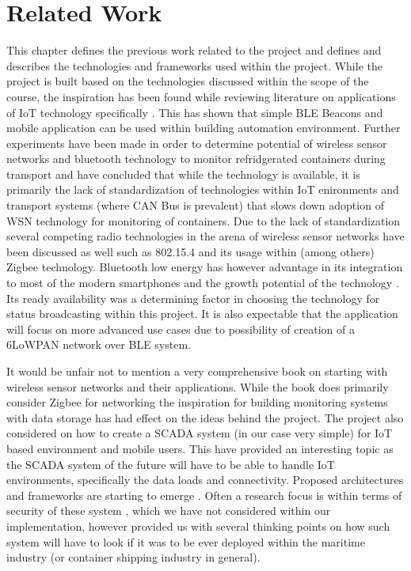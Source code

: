 \chapter{Related Work}
\label{cha:related-work}


This chapter defines the previous work related to the project and defines and describes the technologies and frameworks used within the project. While the project is built based on the technologies discussed within the scope of the course, the inspiration has been found while reviewing literature on applications of IoT technology specifically \citep{7396510}. This has shown that simple BLE Beacons and mobile application can be used within building automation environment. Further experiments have been made in order to determine potential of wireless sensor networks and bluetooth technology to monitor refridgerated containers during transport \citep{SJAR234} and have concluded that while the technology is available, it is primarily the lack of standardization of technologies within IoT enironments and transport systems (where CAN Bus is prevalent) that slows down adoption of WSN technology for monitoring of containers. Due to the lack of standardization several competing radio technologies in the arena of wireless sensor networks have been discussed as well such as 802.15.4 and its usage within (among others) Zigbee technology. Bluetooth low energy has however advantage in its integration to most of the modern smartphones and the growth potential of the technology \citep{statista}. Its ready availability was a determining factor in choosing the technology for status broadcasting within this project. It is also expectable that the application will focus on more advanced use cases due to possibility of creation of a 6LoWPAN \citep{RFC7668} \citep{article} network over BLE system. 

\bigskip

It would be unfair not to mention a very comprehensive book \citep{Bell2013:978-1-4302-5825-4} on starting with wireless sensor networks and their applications. While the book does primarily consider Zigbee for networking the inspiration for building monitoring systems with data storage has had effect on the ideas behind the project. The project also considered on how to create a SCADA system (in our case very simple) for IoT based environment and mobile users. This have provided an interesting topic as the SCADA system of the future will have to be able to handle IoT environments, specifically the data loads and connectivity. Proposed architectures and frameworks are starting to emerge \citep{unknown}. Often a research focus is within terms of security of these system \citep{article2}, which we have not considered within our implementation, however provided us with several thinking points on how such system will have to look if it was to be ever deployed within the maritime industry (or container shipping industry in general).

